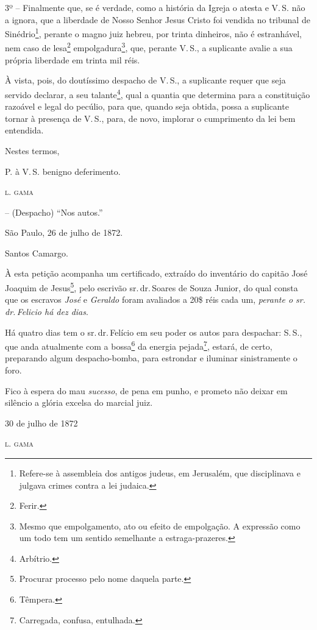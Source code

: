 3º -- Finalmente que, se é verdade, como a história da Igreja o atesta e
V.\,S. não a ignora, que a liberdade de Nosso Senhor Jesus Cristo foi
vendida no tribunal de Sinédrio\footnote{ Refere-se à assembleia dos
  antigos judeus, em Jerusalém, que disciplinava e julgava crimes contra
  a lei judaica.}, perante o magno juiz hebreu, por trinta dinheiros,
não é estranhável, nem caso de lesa\footnote{ Ferir.}
empolgadura\footnote{ Mesmo que empolgamento, ato ou efeito de
  empolgação. A expressão como um todo tem um sentido semelhante a
  estraga-prazeres.}, que, perante V.\,S., a suplicante avalie a sua
própria liberdade em trinta mil réis.

À vista, pois, do doutíssimo despacho de V.\,S., a suplicante requer que
seja servido declarar, a seu talante\footnote{ Arbítrio.}, qual a
quantia que determina para a constituição razoável e legal do pecúlio,
para que, quando seja obtida, possa a suplicante tornar à presença de V.\,S., para, de novo, implorar o cumprimento da lei bem entendida.

\begin{flushright}
Nestes termos,

P. à V.\,S. benigno deferimento.

\textsc{l. gama}
\end{flushright}

-- (Despacho) ``Nos autos.''

São Paulo, 26 de julho de 1872.

Santos Camargo.

À esta petição acompanha um certificado, extraído do inventário do
capitão José Joaquim de Jesus\footnote{ Procurar processo pelo nome
  daquela parte.}, pelo escrivão sr.\,dr.\,Soares de Souza Junior, do qual
consta que os escravos \emph{José} e \emph{Geraldo} foram avaliados a
20\$ réis cada um, \emph{perante o sr.\,dr.\,Felicio há dez dias}.

\asterisc

Há quatro dias tem o sr.\,dr.\,Felício em seu poder os autos para
despachar: S.\,S., que anda atualmente com a bossa\footnote{ Têmpera.}
da energia pejada\footnote{ Carregada, confusa, entulhada.}, estará, de
certo, preparando algum despacho-bomba, para estrondar e iluminar
sinistramente o foro.

Fico à espera do mau \emph{sucesso}, de pena em punho, e prometo não
deixar em silêncio a glória excelsa do marcial juiz.

\begin{flushright}
30 de julho de 1872

\textsc{l. gama}
\end{flushright}

